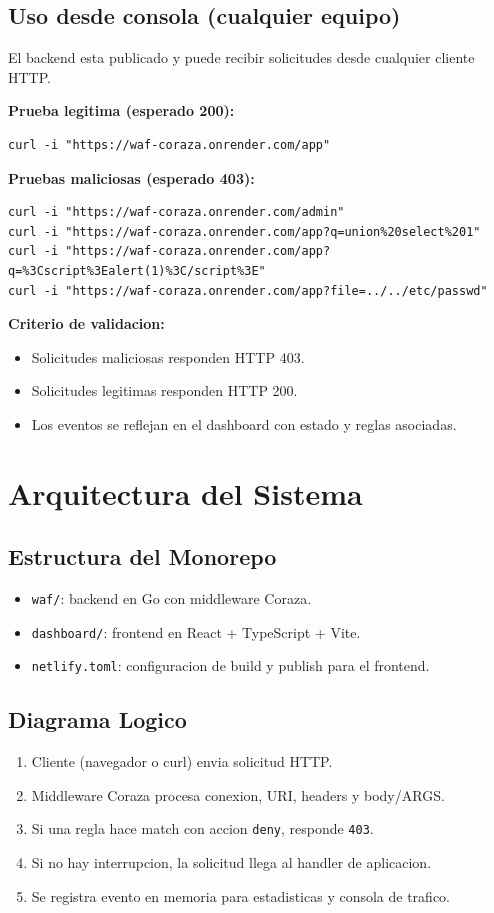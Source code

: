 \documentclass[12pt,a4paper]{article}
\begin{document}
\subsection{Uso desde consola (cualquier equipo)}
El backend esta publicado y puede recibir solicitudes desde cualquier cliente HTTP.

\textbf{Prueba legitima (esperado 200):}
\begin{lstlisting}
curl -i "https://waf-coraza.onrender.com/app"
\end{lstlisting}

\textbf{Pruebas maliciosas (esperado 403):}
\begin{lstlisting}
curl -i "https://waf-coraza.onrender.com/admin"
curl -i "https://waf-coraza.onrender.com/app?q=union%20select%201"
curl -i "https://waf-coraza.onrender.com/app?q=%3Cscript%3Ealert(1)%3C/script%3E"
curl -i "https://waf-coraza.onrender.com/app?file=../../etc/passwd"
\end{lstlisting}

\textbf{Criterio de validacion:}
\begin{itemize}
  \item Solicitudes maliciosas responden HTTP 403.
  \item Solicitudes legitimas responden HTTP 200.
  \item Los eventos se reflejan en el dashboard con estado y reglas asociadas.
\end{itemize}

\section{Arquitectura del Sistema}
\subsection{Estructura del Monorepo}
\begin{itemize}
  \item \texttt{waf/}: backend en Go con middleware Coraza.
  \item \texttt{dashboard/}: frontend en React + TypeScript + Vite.
  \item \texttt{netlify.toml}: configuracion de build y publish para el frontend.
\end{itemize}

\subsection{Diagrama Logico}
\begin{enumerate}
  \item Cliente (navegador o curl) envia solicitud HTTP.
  \item Middleware Coraza procesa conexion, URI, headers y body/ARGS.
  \item Si una regla hace match con accion \texttt{deny}, responde \texttt{403}.
  \item Si no hay interrupcion, la solicitud llega al handler de aplicacion.
  \item Se registra evento en memoria para estadisticas y consola de trafico.
\end{enumerate}
\end{document}
